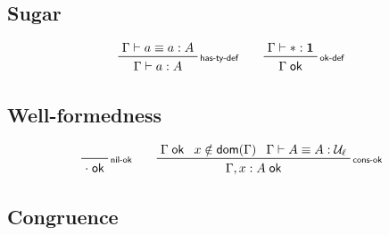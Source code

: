 \documentclass[acmsmall,screen,review]{acmart}
\newcommand{\mc}[1]{\ensuremath{\mathcal{#1}}}
\newcommand{\mb}[1]{\ensuremath{\mathbf{#1}}}
\newcommand{\ms}[1]{\ensuremath{\mathsf{#1}}}
\newcommand{\rle}[1]{{\scriptsize\textsf{#1}}}
\newcommand{\isok}[1]{#1\;\ms{ok}}
\newcommand{\jeq}[4]{#1 \vdash #2 \equiv #3 : #4}
\newcommand{\hasty}[3]{#1 \vdash #2 : #3}
\begin{document}
\subsection{Sugar}

\begin{gather*}
    \prftree[r]{\rle{has-ty-def}}
        {\jeq{\Gamma}{a}{a}{A}}
        {\hasty{\Gamma}{a}{A}} \qquad
    \prftree[r]{\rle{ok-def}}
        {\hasty{\Gamma}{*}{\mb{1}}}
        {\isok{\Gamma}}
\end{gather*}

\subsection{Well-formedness}

\begin{gather*}
    \prftree[r]{\rle{nil-ok}}
        {}
        {\isok{\cdot}} \qquad
    \prftree[r]{\rle{cons-ok}}
        {\isok{\Gamma}}
        {x \notin \ms{dom}(\Gamma)}
        {\jeq{\Gamma}{A}{A}{\mc{U}_\ell}}
        {\isok{\Gamma, x : A}}
\end{gather*}

\subsection{Congruence}
\end{document}
